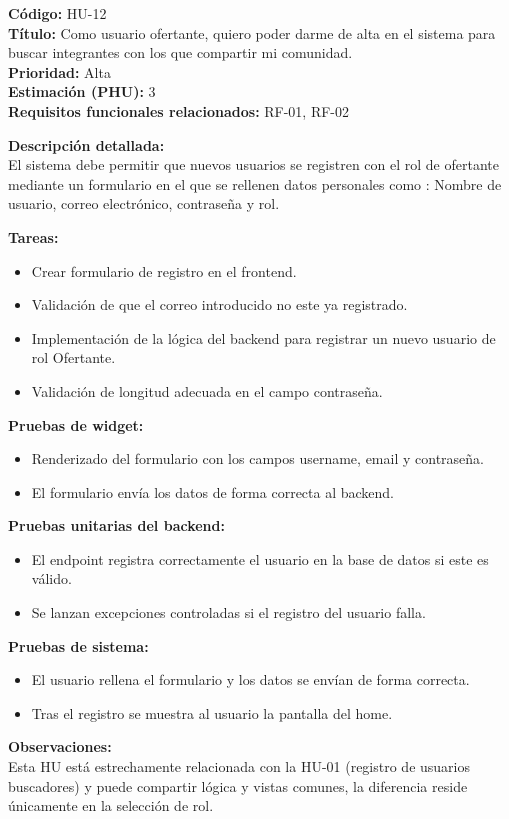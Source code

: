 \begin{tarjetaHU}
\textbf{Código:} HU-12 \\
\textbf{Título:} Como usuario ofertante, quiero poder darme de alta en el sistema para buscar integrantes con los que compartir mi comunidad. \\
\textbf{Prioridad:} Alta \\
\textbf{Estimación (PHU):} 3 \\
\textbf{Requisitos funcionales relacionados:} RF-01, RF-02

\vspace{0.5em}
\textbf{Descripción detallada:} \\
El sistema debe permitir que nuevos usuarios se registren con el rol de ofertante mediante un formulario en el que se rellenen datos personales como : Nombre de usuario, correo electrónico, contraseña y rol. 

\vspace{0.5em}
\textbf{Tareas:}
\begin{itemize}[left=0pt]
  \item Crear formulario de registro en el frontend. 
  \item Validación de que el correo introducido no este ya registrado.
  \item Implementación de la lógica del backend para registrar un nuevo usuario de rol Ofertante.
  \item Validación de longitud adecuada en el campo contraseña.
\end{itemize}

\vspace{0.5em}
\textbf{Pruebas de widget:}
\begin{itemize}[left=0pt]
  \item Renderizado del formulario con los campos username, email y contraseña.
  \item El formulario envía los datos de forma correcta al backend.
\end{itemize}
\textbf{Pruebas unitarias del backend:}
\begin{itemize}[left=0pt]
  \item El endpoint registra correctamente el usuario en la base de datos si este es válido.
  \item Se lanzan excepciones controladas si el registro del usuario falla.
\end{itemize}
\textbf{Pruebas de sistema:}
\begin{itemize}[left=0pt]
\item El usuario rellena el formulario y los datos se envían de forma correcta.
\item Tras el registro se muestra al usuario la pantalla del home.
\end{itemize}
\textbf{Observaciones:} \\
Esta HU está estrechamente relacionada con la HU-01 (registro de usuarios buscadores) y puede compartir lógica y vistas comunes, la diferencia reside únicamente en la selección de rol.

\end{tarjetaHU}

